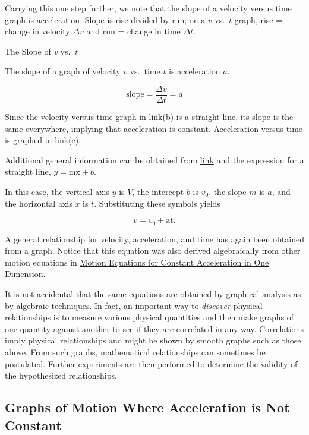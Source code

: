 \documentclass[
]{book}
\begin{document}
Carrying this one step further, we note that the slope of a velocity
versus time graph is acceleration. Slope is rise divided by run; on a
\(v{}\) vs.~\(t\) graph, rise = change in velocity \({\Delta v}{}\) and run =
change in time \({\Delta t}{}\).

\hypertarget{fs-id1405001}{}
The Slope of \emph{v} vs.~\emph{t}

The slope of a graph of velocity \(v{}\) vs.~time \(t{}\) is acceleration
\(a{}\).

\leavevmode{}%
\[\text{slope} = \frac{\Delta v}{\Delta t} = a\]

Since the velocity versus time graph in
\protect\hyperlink{import-auto-id3596921}{link}(b) is a straight
line, its slope is the same everywhere, implying that acceleration is
constant. Acceleration versus time is graphed in
\protect\hyperlink{import-auto-id3596921}{link}(c).

Additional general information can be obtained from
\protect\hyperlink{import-auto-id4141386}{link} and the
expression for a straight line, \({y = {\text{mx} + b}}{}\).

In this case, the vertical axis \(y{}\) is \(V{}\), the intercept \(b{}\) is
\(v_{0}{}\), the slope \(m{}\) is \(a{}\), and the horizontal axis \(x{}\) is
\(t{}\). Substituting these symbols yields

\leavevmode{}%
\[{v = {v_{0} + \text{at}}.}{}\]

A general relationship for velocity, acceleration, and time has again
been obtained from a graph. Notice that this equation was also derived
algebraically from other motion equations in \href{/m54773}{Motion Equations for
Constant Acceleration in One Dimension}.

It is not accidental that the same equations are obtained by graphical
analysis as by algebraic techniques. In fact, an important way to
\emph{discover} physical relationships is to measure various physical
quantities and then make graphs of one quantity against another to see
if they are correlated in any way. Correlations imply physical
relationships and might be shown by smooth graphs such as those above.
From such graphs, mathematical relationships can sometimes be
postulated. Further experiments are then performed to determine the
validity of the hypothesized relationships.

\hypertarget{fs-id2306208}{}
\hypertarget{graphs-of-motion-where-acceleration-is-not-constant}{%
\subsection{Graphs of Motion Where Acceleration is Not Constant}\label{graphs-of-motion-where-acceleration-is-not-constant}}
\end{document}
